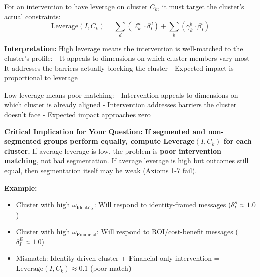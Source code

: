 \begin{tcolorbox}[colback=red!5!white, colframe=red!75!black,
    title=Axiom SEG-MATCH-8: Intervention Leverage Principle]
For an intervention to have leverage on cluster $C_k$, it must target the cluster's actual constraints:
\begin{equation}
\text{Leverage}(I, C_k) = \sum_d (\ell_k^d \cdot \delta_I^d) + \sum_b (\gamma_k^b \cdot \beta_I^b)
\end{equation}

\textbf{Interpretation:}
High leverage means the intervention is well-matched to the cluster's profile:
- It appeals to dimensions on which cluster members vary most
- It addresses the barriers actually blocking the cluster
- Expected impact is proportional to leverage

Low leverage means poor matching:
- Intervention appeals to dimensions on which cluster is already aligned
- Intervention addresses barriers the cluster doesn't face
- Expected impact approaches zero

\textbf{Critical Implication for Your Question:}
\textbf{If segmented and non-segmented groups perform equally, compute Leverage$(I, C_k)$ for each cluster.}
If average leverage is low, the problem is \textbf{poor intervention matching}, not bad segmentation.
If average leverage is high but outcomes still equal, then segmentation itself may be weak (Axioms 1-7 fail).

\textbf{Example:}
\begin{itemize}[nosep]
\item Cluster with high $\omega_{\text{Identity}}$: Will respond to identity-framed messages ($\delta_I^{S} \approx 1.0$)
\item Cluster with high $\omega_{\text{Financial}}$: Will respond to ROI/cost-benefit messages ($\delta_I^{E} \approx 1.0$)
\item Mismatch: Identity-driven cluster + Financial-only intervention = $\text{Leverage}(I, C_k) \approx 0.1$ (poor match)
\end{itemize}

\end{tcolorbox}

\vspace{1em}


